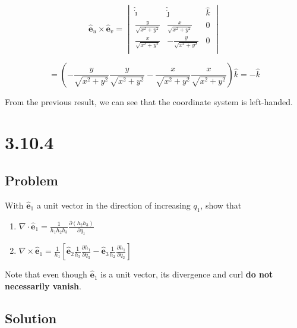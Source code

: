 \documentclass[12pt]{article}
\begin{document}
\[
    \hat{\mathbf{e}}_u \times \hat{\mathbf{e}}_v =
    \begin{vmatrix}
        \hat{\dot{\imath}}         & \hat{\dot{\jmath}}          & \hat{k} \\
        \frac{y}{\sqrt{x^2 + y^2}} & \frac{x}{\sqrt{x^2 + y^2}}  & 0       \\
        \frac{x}{\sqrt{x^2 + y^2}} & -\frac{y}{\sqrt{x^2 + y^2}} & 0       \\
    \end{vmatrix}
\]

\[
    = \left(
    - \frac{y}{\sqrt{x^2 + y^2}} \frac{y}{\sqrt{x^2 + y^2}}
    - \frac{x}{\sqrt{x^2 + y^2}} \frac{x}{\sqrt{x^2 + y^2}}
    \right) \hat{k} = -\hat{k}
\]

From the previous result, we can see that the coordinate system is left-handed.

\section{3.10.4}

\subsection{Problem}

With \(\hat{\mathbf{e}}_1\) a unit vector in the direction of increasing \(q_1\), show that
\bigskip

\begin{enumerate}[label= \textbf{(\alph*)}]
    \item
          \(
          \nabla \cdot \hat{\mathbf{e}}_1 =
          \frac{1}{h_1 h_2 h_3} \frac{\partial \left(h_2 h_3\right)}{\partial q_1}
          \)

    \item
          \(
          \nabla \times \hat{\mathbf{e}}_1 = \frac{1}{h_1}
          \left[
              \hat{\mathbf{e}}_2 \frac{1}{h_3} \frac{\partial h_1}{\partial q_3}
              - \hat{\mathbf{e}}_3  \frac{1}{h_2}  \frac{\partial h_1}{\partial q_2}
              \right]
          \)
\end{enumerate}
\bigskip

Note that even though \(\hat{\mathbf{e}}_1\) is a unit vector, its divergence and curl \textbf{do
    not necessarily vanish}.

\subsection{Solution}
\end{document}
